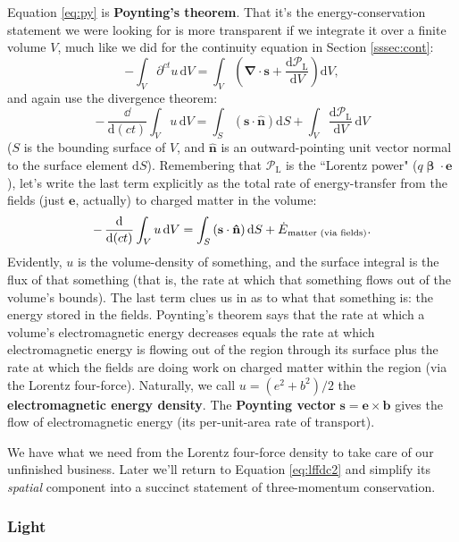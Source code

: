 \documentclass[12pt]{article}
\renewcommand{\vv}[1]{\mathbf{#1}}
\newcommand{\dd}[1]{\mathrm{d}#1}
\newcommand{\vvbeta}{\bm{\upbeta}}
\newcommand{\del}{\boldsymbol{\nabla}}
\begin{document}
Equation \ref{eq:py} is \textbf{Poynting's theorem}. That it's the energy-conservation statement we were looking for is more transparent if we integrate it over a finite volume $V$, much like we did for the continuity equation in Section \ref{sssec:cont}:
\begin{equation*}
- \int_V \partial^{ct} u \, \dd V = \int_V \left(  \del \cdot \vv s + \dfrac{\dd \mathcal{P}_{\textrm{L}}}{\dd V} \right) \dd V ,
\end{equation*}
and again use the divergence theorem:
\begin{equation*}
- \, \dfrac{\dd}{\dd (ct)} \int_V u \, \dd V = \int_S \left( \vv s \cdot \vv{\hat{n}} \right) \dd S + \int_V \dfrac{\dd \mathcal{P}_{\textrm{L}}}{\dd V} \, \dd V
\end{equation*}
($S$ is the bounding surface of $V$, and $\vv{\hat{n}}$ is an outward-pointing unit vector normal to the surface element $\dd S$). Remembering that $\mathcal{P}_{\textrm{L}}$ is the ``Lorentz power" ($q \vvbeta \cdot \vv e$), let's write the last term explicitly as the total rate of energy-transfer from the fields (just $\vv e$, actually) to charged matter in the volume:
\begin{equation*}
- \, \dfrac{\dd}{\dd (ct)} \int_V u \, \dd V = \int_S \left( \vv s \cdot \vv{\hat{n}} \right) \dd S + \dot{E}_{\mkern1mu \textrm{matter (via fields)}} .
\end{equation*}
Evidently, $u$ is the volume-density of something, and the surface integral is the flux of that something (that is, the rate at which that something flows out of the volume's bounds). The last term clues us in as to what that something is: the energy stored in the fields. Poynting's theorem says that the rate at which a volume's electromagnetic energy decreases equals the rate at which electromagnetic energy is flowing out of the region through its surface plus the rate at which the fields are doing work on charged matter within the region (via the Lorentz four-force). Naturally, we call $u = (e^2 + b^2)/2$ the \textbf{electromagnetic energy density}. The \textbf{Poynting vector} $\vv s = \vv e \times \vv b$ gives the flow of electromagnetic energy (its per-unit-area rate of transport).

We have what we need from the Lorentz four-force density to take care of our unfinished business. Later we'll return to Equation \ref{eq:lffdc2} and simplify its \emph{spatial} component into a succinct statement of three-momentum conservation.


\subsubsection{Light}\label{sssec:li}
\end{document}
